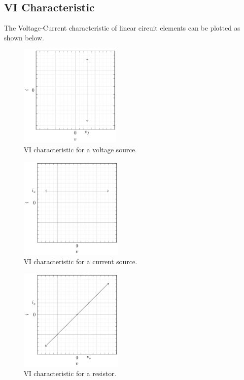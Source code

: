 \documentclass{article}
\begin{document}
\subsection{VI Characteristic}
The Voltage-Current characteristic of linear circuit elements can be plotted as shown below.
\begin{figure}[H]
    \centering
    \includegraphics[height = 5cm, keepaspectratio = true]{figures/vi_characteristic_voltage_source.pdf}
    \caption{VI characteristic for a voltage source.}
\end{figure}
\begin{figure}[H]
    \centering
    \includegraphics[height = 5cm, keepaspectratio = true]{figures/vi_characteristic_current_source.pdf}
    \caption{VI characteristic for a current source.}
\end{figure}
\begin{figure}[H]
    \centering
    \includegraphics[height = 5cm, keepaspectratio = true]{figures/vi_characteristic_resistor.pdf}
    \caption{VI characteristic for a resistor.}
\end{figure}
\end{document}
